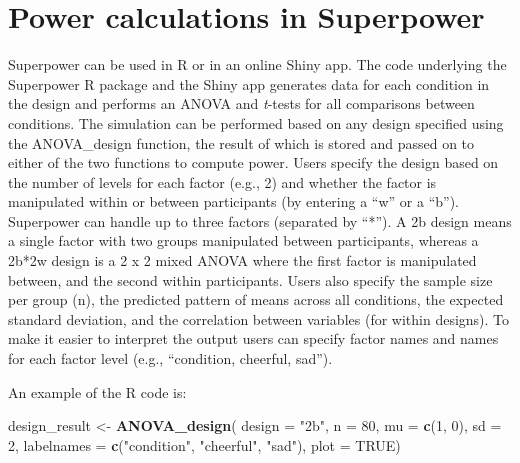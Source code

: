 \documentclass[
  english,
  ,jou,floatsintext]{apa6}
\newenvironment{Shaded}{\begin{snugshade}}{\end{snugshade}}
\newcommand{\DataTypeTok}[1]{\textcolor[rgb]{0.13,0.29,0.53}{#1}}
\newcommand{\DecValTok}[1]{\textcolor[rgb]{0.00,0.00,0.81}{#1}}
\newcommand{\KeywordTok}[1]{\textcolor[rgb]{0.13,0.29,0.53}{\textbf{#1}}}
\newcommand{\NormalTok}[1]{#1}
\newcommand{\OtherTok}[1]{\textcolor[rgb]{0.56,0.35,0.01}{#1}}
\newcommand{\StringTok}[1]{\textcolor[rgb]{0.31,0.60,0.02}{#1}}
\begin{document}
\hypertarget{power-calculations-in-superpower}{%
\section{Power calculations in Superpower}\label{power-calculations-in-superpower}}

Superpower can be used in R or in an online Shiny app.
The code underlying the Superpower R package and the Shiny app generates data for each condition in the design and performs an ANOVA and \emph{t}-tests for all comparisons between conditions.
The simulation can be performed based on any design specified using the ANOVA\_design function, the result of which is stored and passed on to either of the two functions to compute power.
Users specify the design based on the number of levels for each factor (e.g., 2) and whether the factor is manipulated within or between participants (by entering a \enquote{w} or a \enquote{b}).
Superpower can handle up to three factors (separated by \enquote{*}).
A 2b design means a single factor with two groups manipulated between participants, whereas a 2b*2w design is a 2 x 2 mixed ANOVA where the first factor is manipulated between, and the second within participants.
Users also specify the sample size per group (n), the predicted pattern of means across all conditions, the expected standard deviation, and the correlation between variables (for within designs).
To make it easier to interpret the output users can specify factor names and names for each factor level (e.g., \enquote{condition, cheerful, sad}).

An example of the R code is:

\begin{Shaded}
\begin{Highlighting}[]
\NormalTok{design_result <-}\StringTok{ }\KeywordTok{ANOVA_design}\NormalTok{(}
  \DataTypeTok{design =} \StringTok{"2b"}\NormalTok{, }\DataTypeTok{n =} \DecValTok{80}\NormalTok{, }
  \DataTypeTok{mu =} \KeywordTok{c}\NormalTok{(}\DecValTok{1}\NormalTok{, }\DecValTok{0}\NormalTok{), }\DataTypeTok{sd =} \DecValTok{2}\NormalTok{,}
  \DataTypeTok{labelnames =} \KeywordTok{c}\NormalTok{(}\StringTok{"condition"}\NormalTok{, }
                 \StringTok{"cheerful"}\NormalTok{, }\StringTok{"sad"}\NormalTok{),}
  \DataTypeTok{plot =} \OtherTok{TRUE}\NormalTok{)}
\end{Highlighting}
\end{Shaded}
\end{document}
